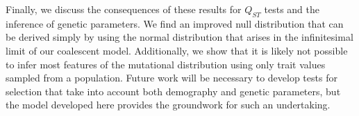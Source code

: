 Finally, we discuss the consequences of these results for $Q_{ST}$ tests and the
inference of genetic parameters. We find an improved null distribution that
can be derived simply by using the normal distribution that arises in the
infinitesimal limit of our coalescent model. Additionally, we show that it is
likely not possible to infer most features of the mutational distribution using
only trait values sampled from a population. Future work will be necessary to
develop tests for selection that take into account both demography and genetic
parameters, but the model developed here provides the groundwork for such an
undertaking.

